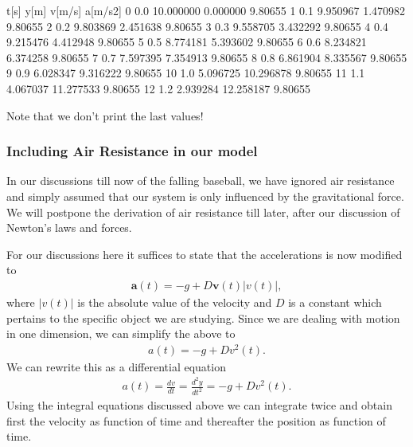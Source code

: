 \documentclass[letterpaper,10pt,english]{sphinxmanual}
\begin{document}
\begin{sphinxVerbatim}[commandchars=\\\{\}]
    t[s]       y[m]     v[m/s]  a[m/s\PYGZca{}2]
0    0.0  10.000000   0.000000  \PYGZhy{}9.80655
1    0.1   9.950967  \PYGZhy{}1.470982  \PYGZhy{}9.80655
2    0.2   9.803869  \PYGZhy{}2.451638  \PYGZhy{}9.80655
3    0.3   9.558705  \PYGZhy{}3.432292  \PYGZhy{}9.80655
4    0.4   9.215476  \PYGZhy{}4.412948  \PYGZhy{}9.80655
5    0.5   8.774181  \PYGZhy{}5.393602  \PYGZhy{}9.80655
6    0.6   8.234821  \PYGZhy{}6.374258  \PYGZhy{}9.80655
7    0.7   7.597395  \PYGZhy{}7.354913  \PYGZhy{}9.80655
8    0.8   6.861904  \PYGZhy{}8.335567  \PYGZhy{}9.80655
9    0.9   6.028347  \PYGZhy{}9.316222  \PYGZhy{}9.80655
10   1.0   5.096725 \PYGZhy{}10.296878  \PYGZhy{}9.80655
11   1.1   4.067037 \PYGZhy{}11.277533  \PYGZhy{}9.80655
12   1.2   2.939284 \PYGZhy{}12.258187  \PYGZhy{}9.80655
\end{sphinxVerbatim}

Note that we don’t print the last values!


\subsubsection{Including Air Resistance in our model}
\label{\detokenize{chapter2:including-air-resistance-in-our-model}}
In our discussions till now of the falling baseball, we have ignored
air resistance and simply assumed that our system is only influenced
by the gravitational force.  We will postpone the derivation of air
resistance till later, after our discussion of Newton’s laws and
forces.

For our discussions here it suffices to state that the accelerations is now modified to
\begin{equation*}
\begin{split}
\boldsymbol{a}(t) = -g +D\boldsymbol{v}(t)\vert v(t)\vert,
\end{split}
\end{equation*}
where \(\vert v(t)\vert\) is the absolute value of the velocity and \(D\) is a constant which pertains to the specific object we are studying.
Since we are dealing with motion in one dimension, we can simplify the above to
\begin{equation*}
\begin{split}
a(t) = -g +Dv^2(t).
\end{split}
\end{equation*}
We can rewrite this as a differential equation
\begin{equation*}
\begin{split}
a(t) = \frac{dv}{dt}=\frac{d^2y}{dt^2}= -g +Dv^2(t).
\end{split}
\end{equation*}
Using the integral equations discussed above we can integrate twice
and obtain first the velocity as function of time and thereafter the
position as function of time.
\end{document}
